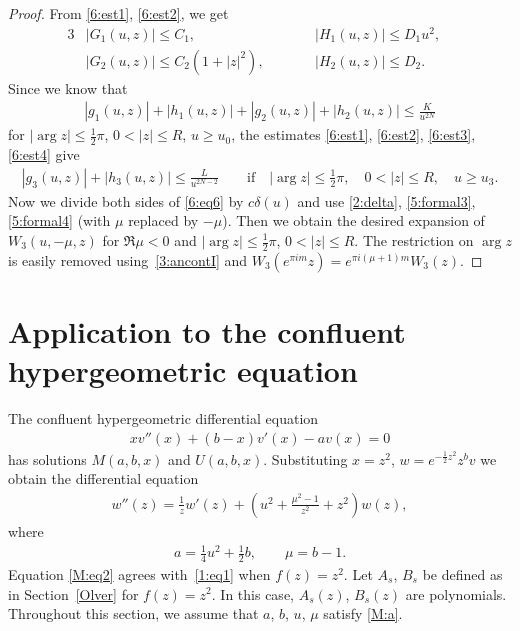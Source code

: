 \documentclass[pdftex]{sigma}
\numberwithin{equation}{section}
\begin{document}
\begin{proof}
From \eqref{6:est1}, \eqref{6:est2}, we get
\begin{alignat}{3}
& |G_1(u,z)|\le C_1,\qquad && |H_1(u,z)|\le D_1 u^2,& \label{6:est3}\\
&|G_2(u,z)|\le C_2(1+|z|^2),\qquad && |H_2(u,z)|\le D_2 .&\label{6:est4}
\end{alignat}
Since we know that
\begin{gather*}
|g_1(u,z)|+|h_1(u,z)|+|g_2(u,z)|+|h_2(u,z)|\le \frac{K}{u^{2N}}
\end{gather*}
for $| \arg z|\le \frac12\pi$, $0<|z|\le R$, $u\ge u_0$,
the estimates \eqref{6:est1}, \eqref{6:est2}, \eqref{6:est3}, \eqref{6:est4}
give
\begin{gather*}%
|g_3(u,z)|+|h_3(u,z)|\le \frac{L}{u^{2N-2}}\qquad\text{if} \quad |\arg z|\le \frac12\pi, \quad 0<|z|\le R, \quad u\ge u_3.
\end{gather*}
Now we divide both sides of \eqref{6:eq6} by $c\delta(u)$ and use \eqref{2:delta}, \eqref{5:formal3}, \eqref{5:formal4} (with $\mu$ replaced by $-\mu$).
Then we obtain the desired expansion of $W_3(u,-\mu,z)$ for $\Re\mu<0$ and $|\arg z|\le \frac12\pi$, $0<|z|\le R$.
The restriction on $\arg z$ is easily removed using~\eqref{3:ancontI} and $W_3(e^{\pi im}z)=e^{\pi i (\mu+1)m} W_3(z)$.
\end{proof}

\section{Application to the conf\/luent hypergeometric equation}\label{confluent}
The conf\/luent hypergeometric dif\/ferential equation
\begin{gather*}%
xv''(x)+(b-x)v'(x)-av(x)=0
\end{gather*}
has solutions $M(a,b,x)$ and $U(a,b,x)$.
Substituting $x=z^2$, $w=e^{-\frac12 z^2}z^b v$ we obtain the dif\/ferential equation
\begin{gather}\label{M:eq2}
w''(z)=\frac1z w'(z)+\left(u^2+\frac{\mu^2-1}{z^2}+z^2\right)w(z),
\end{gather}
where
\begin{gather}\label{M:a}
 a=\frac14 u^2+\frac12 b, \qquad \mu=b-1.
\end{gather}
Equation \eqref{M:eq2} agrees with~\eqref{1:eq1} when $f(z)=z^2$.
Let $A_s$, $B_s$ be def\/ined as in Section~\ref{Olver} for $f(z)=z^2$. In this case, $A_s(z)$, $B_s(z)$ are polynomials.
Throughout this section, we assume that $a$, $b$, $u$, $\mu$ satisfy \eqref{M:a}.
\end{document}
